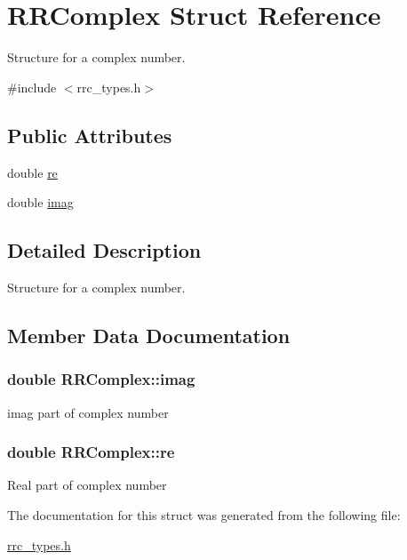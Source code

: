 \hypertarget{struct_r_r_complex}{}\section{R\+R\+Complex Struct Reference}
\label{struct_r_r_complex}


Structure for a complex number.  




{\ttfamily \#include $<$rrc\+\_\+types.\+h$>$}

\subsection*{Public Attributes}
\begin{DoxyCompactItemize}
\item 
double \hyperlink{struct_r_r_complex_a0579715e217fe445879e93003ff90117}{re}
\item 
double \hyperlink{struct_r_r_complex_abdc7d5707ae3febeae997b188c48c8fe}{imag}
\end{DoxyCompactItemize}


\subsection{Detailed Description}
Structure for a complex number. 

\subsection{Member Data Documentation}
\hypertarget{struct_r_r_complex_abdc7d5707ae3febeae997b188c48c8fe}{}
\subsubsection[{imag}]{\setlength{\rightskip}{0pt plus 5cm}double R\+R\+Complex\+::imag}\label{struct_r_r_complex_abdc7d5707ae3febeae997b188c48c8fe}
imag part of complex number \hypertarget{struct_r_r_complex_a0579715e217fe445879e93003ff90117}{}
\subsubsection[{re}]{\setlength{\rightskip}{0pt plus 5cm}double R\+R\+Complex\+::re}\label{struct_r_r_complex_a0579715e217fe445879e93003ff90117}
Real part of complex number 

The documentation for this struct was generated from the following file\+:\begin{DoxyCompactItemize}
\item 
\hyperlink{rrc__types_8h}{rrc\+\_\+types.\+h}\end{DoxyCompactItemize}
